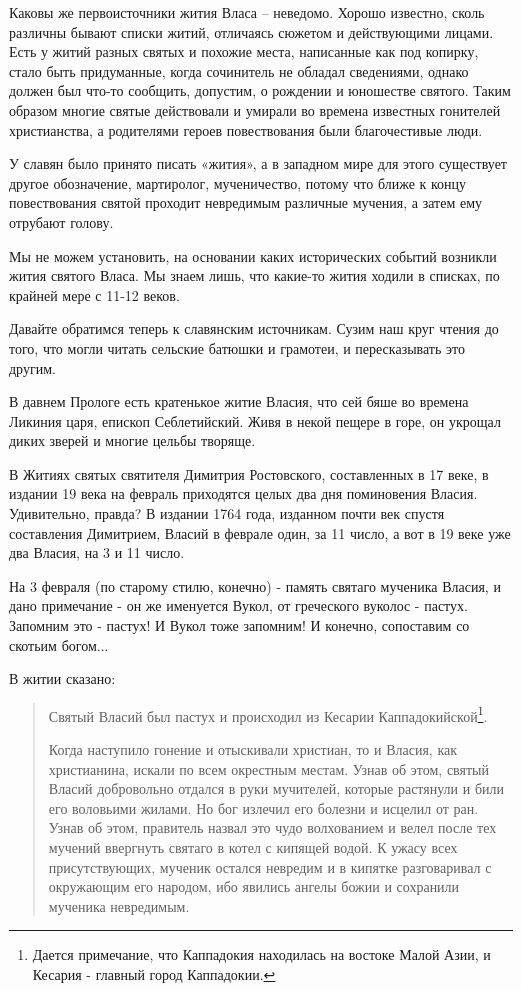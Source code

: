 \documentclass[a5paper,11pt,openany]{article}
\begin{document}
  Каковы же первоисточники жития Власа – неведомо. Хорошо известно, сколь различны бывают списки житий, отличаясь сюжетом и действующими лицами. Есть у житий разных святых и похожие места, написанные как под копирку, стало быть придуманные, когда сочинитель не обладал сведениями, однако должен был что-то сообщить, допустим, о рождении и юношестве святого. Таким образом многие святые действовали и умирали во времена известных гонителей христианства, а родителями героев повествования были благочестивые люди. 

  У славян было принято писать «жития», а в западном мире для этого существует другое обозначение, мартиролог, мученичество, потому что ближе к концу повествования святой проходит невредимым различные мучения, а затем ему отрубают голову. 

    Мы не можем установить, на основании каких исторических событий возникли жития святого Власа. Мы знаем лишь, что какие-то жития ходили в списках, по крайней мере с 11-12 веков.

   Давайте обратимся теперь к славянским источникам. Сузим наш круг чтения до того, что могли читать сельские батюшки и грамотеи, и пересказывать это другим.

    В давнем Прологе есть кратенькое житие Власия, что сей бяше во времена Ликиния царя, епископ Себлетийский. Живя в некой пещере в горе, он укрощал диких зверей и многие цельбы творяще.

  В Житиях святых святителя Димитрия Ростовского, составленных в 17 веке, в издании 19 века на февраль приходятся целых два дня поминовения Власия. Удивительно, правда? В издании 1764 года, изданном почти век спустя составления Димитрием, Власий в феврале один, за 11 число, а вот в 19 веке уже два Власия, на 3 и 11 число.


   На 3 февраля (по старому стилю, конечно) - память святаго мученика Власия, и дано примечание - он же именуется Вукол, от греческого вуколос - пастух. Запомним это - пастух! И Вукол тоже запомним! И конечно, сопоставим со скотьим богом...

   В житии сказано:

\begin{quotation}
\noindent Святый Власий был пастух и происходил из Кесарии Каппадокийской\footnote{Дается примечание, что Каппадокия находилась на востоке Малой Азии, и Кесария - главный город Каппадокии.}.

   Когда наступило гонение и отыскивали христиан, то и Власия, как христианина, искали по всем окрестным местам. Узнав об этом, святый Власий добровольно отдался в руки мучителей, которые растянули и били его воловьими жилами. Но бог излечил его болезни и исцелил от ран. Узнав об этом, правитель назвал это чудо волхованием и велел после тех мучений ввергнуть святаго в котел с кипящей водой. К ужасу всех присутствующих, мученик остался невредим и в кипятке разговаривал с окружающим его народом, ибо явились ангелы божии и сохранили мученика невредимым.\end{quotation} 
\end{document}
